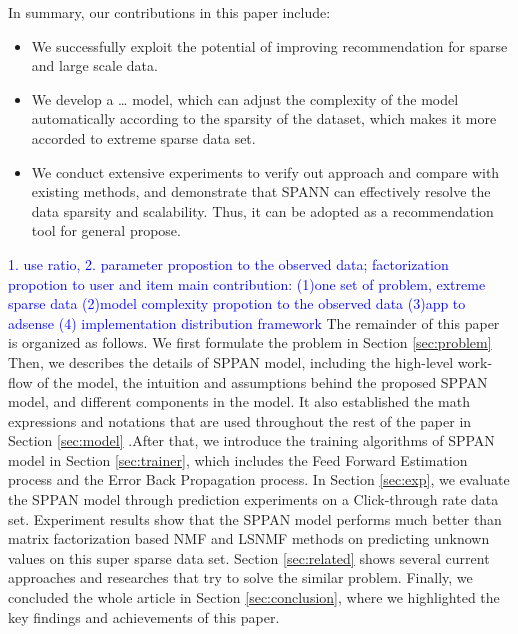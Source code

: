 In summary, our contributions in this paper include:
\begin{itemize} \itemsep -2pt
\item We successfully exploit the potential of improving
  recommendation for sparse and large scale data.
\item We develop a … model, which can adjust the complexity of the
  model automatically according to the sparsity of the dataset, which
  makes it more accorded to extreme sparse data set.
\item We conduct extensive experiments to verify out approach and
  compare with existing methods, and demonstrate that SPANN can
  effectively resolve the data sparsity and scalability. Thus, it can
  be adopted as a recommendation tool for general propose.
\end{itemize}

\textcolor{blue}{ 1. use ratio, 2. parameter propostion to the
  observed data; factorization propotion to user and item main
  contribution: (1)one set of problem, extreme sparse data (2)model
  complexity propotion to the observed data (3)app to adsense (4)
  implementation distribution framework } The remainder of this paper
is organized as follows. We first formulate the problem in Section
\ref{sec:problem} Then, we describes the details of SPPAN model,
including the high-level work-flow of the model, the intuition and
assumptions behind the proposed SPPAN model, and different components
in the model. It also established the math expressions and notations
that are used throughout the rest of the paper in Section
\ref{sec:model} .After that, we introduce the training algorithms of
SPPAN model in Section \ref{sec:trainer}, which includes the Feed
Forward Estimation process and the Error Back Propagation process. In
Section \ref{sec:exp}, we evaluate the SPPAN model through prediction
experiments on a Click-through rate data set. Experiment results show
that the SPPAN model performs much better than matrix factorization
based NMF and LSNMF methods on predicting unknown values on this super
sparse data set. Section \ref{sec:related} shows several current
approaches and researches that try to solve the similar
problem. Finally, we concluded the whole article in Section
\ref{sec:conclusion}, where we highlighted the key findings and
achievements of this paper.

